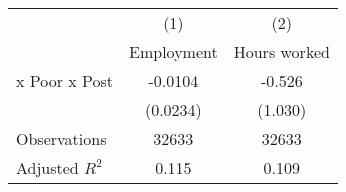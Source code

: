 {
\def\sym#1{\ifmmode^{#1}\else\(^{#1}\)\fi}
\begin{tabular}{l*{2}{c}}
\hline\hline
                &\multicolumn{1}{c}{(1)}&\multicolumn{1}{c}{(2)}\\
                &\multicolumn{1}{c}{Employment}&\multicolumn{1}{c}{Hours worked}\\
\hline
 x Poor x Post  &  -0.0104         &   -0.526         \\
                & (0.0234)         &  (1.030)         \\
\hline
Observations    &    32633         &    32633         \\
Adjusted \(R^{2}\)&    0.115         &    0.109         \\
\hline\hline
\end{tabular}
}
